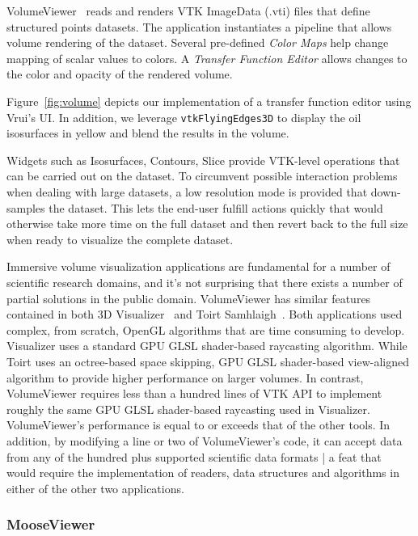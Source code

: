 VolumeViewer~\cite{VolumeViewer} reads and renders VTK ImageData (.vti) files that define structured points datasets.  The application instantiates a pipeline that allows volume rendering of the dataset. Several pre-defined \textit{Color Maps} help change mapping of scalar values to colors. A  \textit{Transfer Function Editor} allows changes to the color and opacity of the rendered volume.

Figure~\ref{fig:volume} depicts our implementation of a transfer function editor using Vrui's UI. In addition, we leverage \texttt{vtkFlyingEdges3D} to display the oil isosurfaces in yellow and blend the results in the volume.

Widgets such as Isosurfaces, Contours, Slice provide VTK-level operations that can be carried out on the dataset. To circumvent possible interaction problems when dealing with large datasets, a low resolution mode is provided that down-samples the dataset. This lets the end-user fulfill actions quickly that would otherwise take more time on the full dataset and then revert back to the full size when ready to visualize the complete dataset.

Immersive volume visualization applications are fundamental for a number of scientific research domains, and it's not surprising that there exists a number of partial solutions in the public domain. VolumeViewer has similar features contained in both 3D Visualizer~\cite{Billen:2008} and Toirt Samhlaigh~\cite{O'Leary:2008}. Both applications used complex, from scratch, OpenGL algorithms that are time consuming to develop. Visualizer uses a standard GPU GLSL shader-based raycasting algorithm. While Toirt uses an octree-based space skipping, GPU GLSL shader-based view-aligned algorithm to provide higher performance on larger volumes. In contrast, VolumeViewer requires less than a hundred lines of VTK API to implement roughly the same GPU GLSL shader-based raycasting used in Visualizer. VolumeViewer's performance is equal to or exceeds that of the other tools. In addition, by modifying a line or two of VolumeViewer's code, it can accept data from any of the hundred plus supported scientific data formats | a feat that would require the implementation of readers, data structures and algorithms in either of the other two applications.

\subsubsection{MooseViewer}

